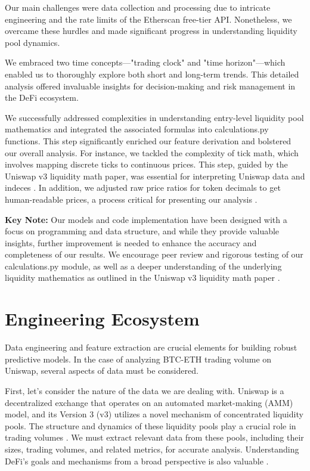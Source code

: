 \documentclass{article}
\begin{document}
Our main challenges were data collection and processing due to intricate engineering and the rate limits of the Etherscan free-tier API\cite{etherscanAPI}. Nonetheless, we overcame these hurdles and made significant progress in understanding liquidity pool dynamics\cite{Miori2022,Aigner2021,Miori2023}.

We embraced two time concepts—"trading clock" and "time horizon"—which enabled us to thoroughly explore both short and long-term trends. This detailed analysis offered invaluable insights for decision-making and risk management in the DeFi ecosystem\cite{Miori2022}.

We successfully addressed complexities in understanding entry-level liquidity pool mathematics and integrated the associated formulas into calculations.py functions. This step significantly enriched our feature derivation and bolstered our overall analysis\cite{Elsts2021,Aigner2021}.
For instance, we tackled the complexity of tick math, which involves mapping discrete ticks to continuous prices. This step, guided by the Uniswap v3 liquidity math paper, was essential for interpreting Uniswap data and indeces \cite{Elsts2021}. In addition, we adjusted raw price ratios for token decimals to get human-readable prices, a process critical for presenting our analysis \cite{Elsts2021}.

\textbf{Key Note:} Our models and code implementation have been designed with a focus on programming and data structure, and while they provide valuable insights, further improvement is needed to enhance the accuracy and completeness of our results. We encourage peer review and rigorous testing of our calculations.py module, as well as a deeper understanding of the underlying liquidity mathematics as outlined in the Uniswap v3 liquidity math paper \cite{Elsts2021,Miori2023}.

\section{\textbf{Engineering Ecosystem}}

Data engineering and feature extraction are crucial elements for building robust predictive models. In the case of analyzing BTC-ETH trading volume on Uniswap, several aspects of data must be considered.

First, let's consider the nature of the data we are dealing with. Uniswap is a decentralized exchange that operates on an automated market-making (AMM) model, and its Version 3 (v3) utilizes a novel mechanism of concentrated liquidity pools. The structure and dynamics of these liquidity pools play a crucial role in trading volumes \cite{Miori2023}. We must extract relevant data from these pools, including their sizes, trading volumes, and related metrics, for accurate analysis. Understanding DeFi's goals and mechanisms from a broad perspective is also valuable \cite{Makarov2022}.
\end{document}
